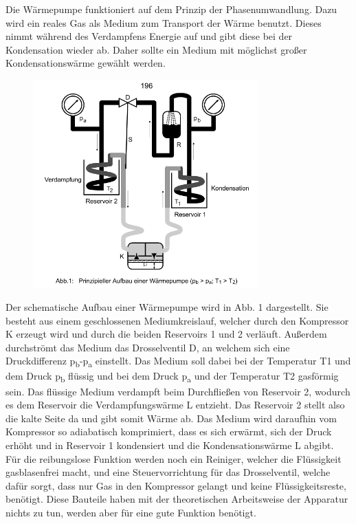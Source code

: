 \documentclass[titlepage=firstcover, captions=tableheading]{scrartcl}
\begin{document}
\noindent Die Wärmepumpe funktioniert auf dem Prinzip der Phasenumwandlung. 
Dazu wird ein reales Gas als Medium zum Transport der Wärme benutzt. 
Dieses nimmt während des Verdampfens Energie auf und gibt diese bei der Kondensation wieder ab. 
Daher sollte ein Medium mit möglichst großer Kondensationswärme gewählt werden.  
\begin{figure}[H]
    \centering
    \includegraphics[height=8cm]{Abb1}
\end{figure}

\noindent Der schematische Aufbau einer Wärmepumpe wird in Abb. 1 dargestellt. 
Sie besteht aus einem geschlossenen Mediumkreislauf, welcher durch den Kompressor K erzeugt wird und durch die beiden Reservoirs 1 und 2 verläuft. 
Außerdem durchströmt das Medium das Drosselventil D, an welchem sich eine Druckdifferenz p\textsubscript{b}-p\textsubscript{a} einstellt. 
Das Medium soll dabei bei der Temperatur T1 und dem Druck p\textsubscript{b} flüssig und bei dem Druck p\textsubscript{a} und der Temperatur T2 gasförmig sein. 
Das flüssige Medium verdampft beim Durchfließen von Reservoir 2, wodurch es dem Reservoir die Verdampfungswärme L entzieht. 
Das Reservoir 2 stellt also die kalte Seite da und gibt somit Wärme ab. 
Das Medium wird daraufhin vom Kompressor so adiabatisch komprimiert, dass es sich erwärmt, sich der Druck erhöht und in Reservoir 1 kondensiert 
und die Kondensationswärme L abgibt.\\

\noindent Für die reibungslose Funktion werden noch ein Reiniger, welcher die Flüssigkeit gasblasenfrei macht, 
und eine Steuervorrichtung für das Drosselventil, welche dafür sorgt, dass nur Gas in den Kompressor gelangt und keine Flüssigkeitsreste, benötigt. 
Diese Bauteile haben mit der theoretischen Arbeitsweise der Apparatur nichts zu tun, werden aber für eine gute Funktion benötigt. 
\end{document}
